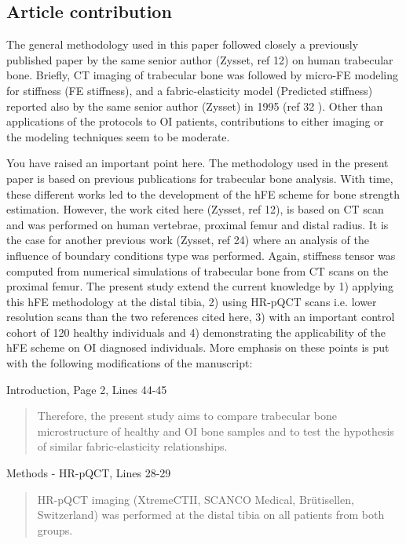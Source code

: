 \documentclass{AR2RC}
\begin{document}
\newpage
\subsection{Article contribution}

\RC The general methodology used in this paper followed closely a previously published paper by the same senior author (Zysset, ref 12) on human trabecular bone. Briefly, CT imaging of trabecular bone was followed by micro-FE modeling for stiffness (FE stiffness), and a fabric-elasticity model (Predicted stiffness) reported also by the same senior author (Zysset) in 1995 (ref 32 ). Other than applications of the protocols to OI patients, contributions to either imaging or the modeling techniques seem to be moderate.

\AR You have raised an important point here. The methodology used in the present paper is based on previous publications for trabecular bone analysis. With time, these different works led to the development of the hFE scheme for bone strength estimation. However, the work cited here (Zysset, ref 12), is based on \si{\micro}CT scan and was performed on human vertebrae, proximal femur and distal radius. It is the case for another previous work (Zysset, ref 24) where an analysis of the influence of boundary conditions type was performed. Again, stiffness tensor was computed from numerical simulations of trabecular bone from \si{\micro}CT scans on the proximal femur. The present study extend the current knowledge by 1) applying this hFE methodology at the distal tibia, 2) using HR-pQCT scans i.e. lower resolution scans than the two references cited here, 3) with an important control cohort of 120 healthy individuals and 4) demonstrating the applicability of the hFE scheme on OI diagnosed individuals. More emphasis on these points is put with the following modifications of the manuscript:\par

Introduction, Page 2, Lines 44-45
\begin{quote}
	Therefore, the present study aims to compare trabecular bone microstructure of healthy and OI bone samples and to test the hypothesis of similar fabric-elasticity relationships.
\end{quote}

Methods - HR-pQCT, Lines 28-29
\begin{quote}
	HR-pQCT imaging (XtremeCTII, SCANCO Medical, Brütisellen, Switzerland) was performed at the distal tibia on all patients from both groups. 
\end{quote}
\end{document}
